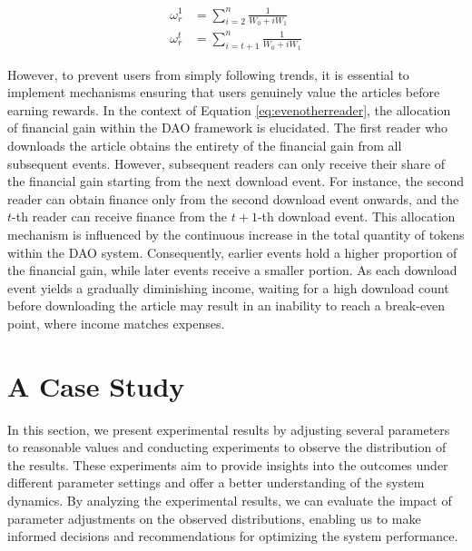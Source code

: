\documentclass[lettersize,journal]{IEEEtran}
\begin{document}
\begin{equation}
  \begin{aligned}
    \omega_r^1 & = \sum_{i = 2}^{n} \frac{1}{W_0 + i W_1}     \\
    \omega_r^t & = \sum_{i = t + 1}^{n} \frac{1}{W_0 + i W_1}
  \end{aligned}
  \label{eq:evenotherreader}
\end{equation}



However, to prevent users from simply following trends, it is essential to implement mechanisms ensuring that users genuinely value the articles before earning rewards. In the context of Equation \ref{eq:evenotherreader}, the allocation of financial gain within the DAO framework is elucidated. The first reader who downloads the article obtains the entirety of the financial gain from all subsequent events. However, subsequent readers can only receive their share of the financial gain starting from the next download event. For instance, the second reader can obtain finance only from the second download event onwards, and the $t$-th reader can receive finance from the $t+1$-th download event.
This allocation mechanism is influenced by the continuous increase in the total quantity of tokens within the DAO system. Consequently, earlier events hold a higher proportion of the financial gain, while later events receive a smaller portion. As each download event yields a gradually diminishing income, waiting for a high download count before downloading the article may result in an inability to reach a break-even point, where income matches expenses.


\section{A Case Study \label{sec:performance}}

In this section, we present experimental results by adjusting several parameters to reasonable values and conducting experiments to observe the distribution of the results. These experiments aim to provide insights into the outcomes under different parameter settings and offer a better understanding of the system dynamics. By analyzing the experimental results, we can evaluate the impact of parameter adjustments on the observed distributions, enabling us to make informed decisions and recommendations for optimizing the system performance.
\end{document}

